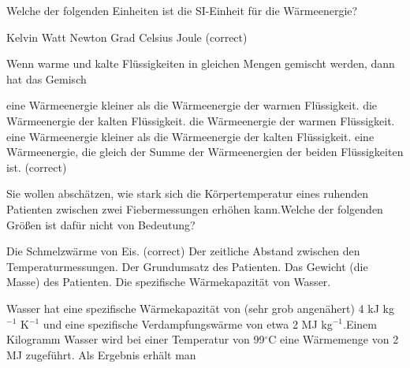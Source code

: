 \documentclass[11pt]{exam}
\begin{document}
\setlength{\voffset}{-0.5in}
\setlength{\headsep}{5pt}

\hspace{2mm}
 \hspace{5mm}
\vspace{4mm}

\begin{questions}

\question Welche der folgenden Einheiten ist die SI-Einheit für die Wärmeenergie?

\begin{choices}
	\choice Kelvin
	\choice Watt
	\choice Newton
	\choice Grad Celsius
	\choice Joule (correct)
\end{choices}

\vspace{3mm}\question Wenn warme und kalte Flüssigkeiten in gleichen Mengen gemischt werden, dann hat das Gemisch

\begin{choices}
	\choice eine Wärmeenergie kleiner als die Wärmeenergie der warmen Flüssigkeit.
	\choice die Wärmeenergie der kalten Flüssigkeit.
	\choice die Wärmeenergie der warmen Flüssigkeit.
	\choice eine Wärmeenergie kleiner als die Wärmeenergie der kalten Flüssigkeit.
	\choice eine Wärmeenergie, die gleich der Summe der Wärmeenergien der beiden Flüssigkeiten ist. (correct)
\end{choices}

\vspace{3mm}\question Sie wollen abschätzen, wie stark sich die Körpertemperatur eines ruhenden Patienten zwischen zwei Fiebermessungen erhöhen kann.Welche der folgenden Größen ist dafür nicht von Bedeutung?

\begin{choices}
	\choice Die Schmelzwärme von Eis. (correct)
	\choice Der zeitliche Abstand zwischen den Temperaturmessungen.
	\choice Der Grundumsatz des Patienten.
	\choice Das Gewicht (die Masse) des Patienten.
	\choice Die spezifische Wärmekapazität von Wasser.
\end{choices}

\vspace{3mm}\question Wasser hat eine spezifische Wärmekapazität von (sehr grob angenähert) 4 kJ kg\(^{-1}\) K\(^{-1}\) und eine spezifische Verdampfungswärme von etwa 2 MJ kg\(^{-1}\).Einem Kilogramm Wasser wird bei einer Temperatur von 99\(^\circ\)C eine Wärmemenge von 2 MJ zugeführt. Als Ergebnis erhält man


\end{questions}
\end{document}
